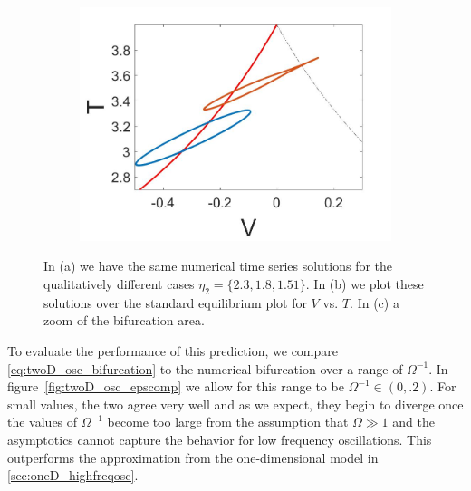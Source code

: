 \begin{figure}[H]
\begin{subfigure}{.5\textwidth}
 \includegraphics[width=\linewidth]{twoD/osc_bif_Tplot_zoom.jpg}
 \caption{}
\end{subfigure}
\caption{In (a) we have the same numerical time series solutions for the qualitatively different cases $\eta_2=\{2.3,1.8,1.51\}$. In (b) we plot these solutions over the standard equilibrium plot for $V$ vs. $T$. In (c) a zoom of the bifurcation area.}
\label{fig:twoD_osc_Tnumerics}
\end{figure}

To evaluate the performance of this prediction, we compare \eqref{eq:twoD_osc_bifurcation} to the numerical bifurcation over a range of $\Omega^{-1}$. In figure~\ref{fig:twoD_osc_epscomp} we allow for this range to be $\Omega^{-1}\in (0,.2)$. For small values, the two agree very well and as we expect, they begin to diverge once the values of $\Omega^{-1}$ become too large from the assumption that $\Omega\gg 1$ and the asymptotics cannot capture the behavior for low frequency oscillations. This outperforms the approximation from the one-dimensional model in \autoref{sec:oneD_highfreqosc}.

